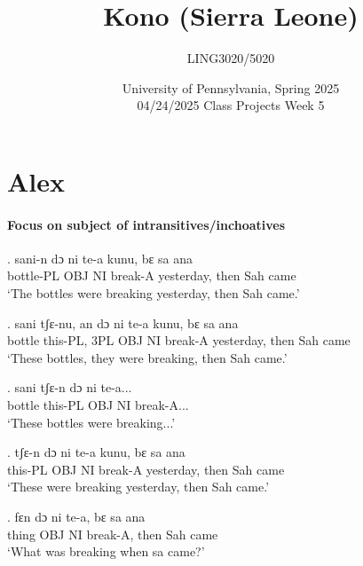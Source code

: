 \documentclass{assets/fieldnotes}
\title{Kono (Sierra Leone)}
\author{LING3020/5020}
\date{University of Pennsylvania, Spring 2025\\04/24/2025 Class Projects Week 5}
\begin{document}
\maketitle

\maketitle
\tableofcontents

\section{Alex}

\paragraph*{Focus on subject of intransitives/inchoatives}

\exg.
sani-n      dɔ    ni   te-a      kunu,        bɛ     sa   ana  \\
bottle-PL   OBJ   NI   break-A   yesterday,   then   Sah   came \\%
`The bottles were breaking yesterday, then Sah came.'

\exg.
sani     tʃɛ-nu,    an    dɔ    ni   te-a      kunu,        bɛ     sa    ana  \\
bottle   this-PL,   3PL   OBJ   NI   break-A   yesterday,   then   Sah   came \\%
`These bottles, they were breaking, then Sah came.' \label{47025}

\exg.
sani     tʃɛ-n     dɔ    ni   te-a...     \\
bottle   this-PL   OBJ   NI   break-A... \\%
`These bottles were breaking...' \label{81039}


\exg.
tʃɛ-n     dɔ    ni   te-a      kunu,        bɛ     sa    ana  \\
this-PL   OBJ   NI   break-A   yesterday,   then   Sah   came \\%
`These were breaking yesterday, then Sah came.'

\exg.
fɛn     dɔ    ni   te-a,      bɛ     sa    ana  \\
thing   OBJ   NI   break-A,   then   Sah   came \\%
`What was breaking when sa came?'
\end{document}
